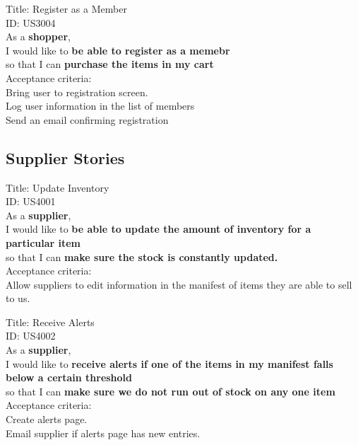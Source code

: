 \documentclass{article}
\begin{document}
\begin{framed}
\noindent
Title: Register as a Member\\
ID: US3004 \\
As a \textbf{shopper},\\
 \textbullet  \quad \quad I would like to \textbf{be able to register as a memebr}\\ 
 \textbullet  \quad \quad so that I can \textbf{purchase the items in my cart}\\
 Acceptance criteria: \\
  \textbullet  \quad \quad Bring user to registration screen. \\
  \textbullet  \quad \quad Log user information in the list of members \\
  \textbullet  \quad \quad Send an email confirming registration \\
\end{framed}

\subsection{Supplier Stories}

\begin{framed}
\noindent
Title:  Update Inventory \\
ID: US4001 \\
As a \textbf{supplier},\\
 \textbullet  \quad \quad I would like to \textbf{be able to update the amount of inventory for a particular item }\\ 
 \textbullet  \quad \quad so that I can \textbf{make sure the stock is constantly updated.}\\
 Acceptance criteria: \\
  \textbullet  \quad \quad Allow suppliers to edit information in the manifest of items they are able to sell to us.
\end{framed}


\begin{framed}
\noindent
Title:  Receive Alerts \\
ID: US4002 \\
As a \textbf{supplier},\\
 \textbullet  \quad \quad I would like to \textbf{receive alerts if one of the items in my manifest falls below a certain threshold }\\ 
 \textbullet  \quad \quad so that I can \textbf{make sure we do not run out of stock on any one item}\\
 Acceptance criteria: \\
  \textbullet  \quad \quad Create alerts page.\\
  \textbullet  \quad \quad Email supplier if alerts page has new entries.
\end{framed}
\end{document}
